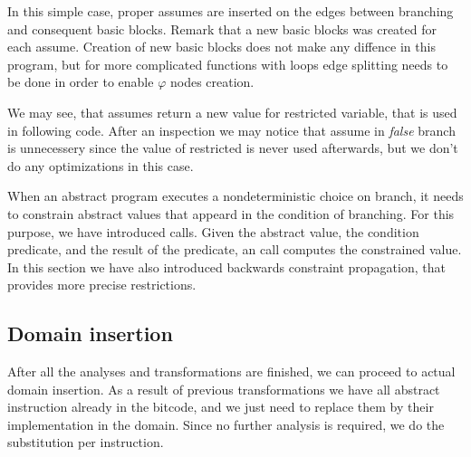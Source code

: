 \begin{example}
{
}
\bigskip

In this simple case, proper assumes are inserted on the edges between branching
and consequent basic blocks. Remark that a new basic blocks was created for each
assume. Creation of new basic blocks does not make any diffence in this
program, but for more complicated functions with loops edge splitting needs
to be done in order to enable $\varphi$ nodes creation.

We may see, that assumes return a new value for restricted variable, that is
used in following code. After an inspection we may notice that assume in
\emph{false} branch is unnecessery since the value of restricted
 is never used afterwards, but we don't do any
optimizations in this case.
\end{example}

\begin{summary}
When an abstract program executes a nondeterministic choice on branch, it needs to
constrain abstract values that appeard in the condition of branching. For this
purpose, we have introduced  calls. Given the abstract value, the condition
predicate, and the result of the predicate, an  call computes the
constrained value. In this section we have also introduced backwards constraint
propagation, that provides more precise restrictions.
\end{summary}

\subsection{Domain insertion}

After all the analyses and transformations are finished, we can proceed to
actual domain insertion. As a result of previous transformations we have all
abstract instruction already in the bitcode, and we just need to replace them by
their implementation in the domain. Since no further analysis is required, we do
the substitution per instruction.


